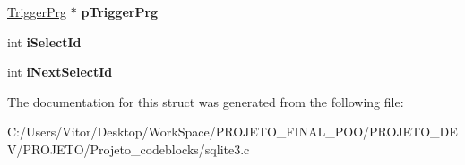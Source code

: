 \begin{DoxyCompactItemize}
\item 
\hypertarget{struct_parse_a0891dbd3b583594c5d07d7b061026ea4}{\hyperlink{struct_trigger_prg}{Trigger\-Prg} $\ast$ {\bfseries p\-Trigger\-Prg}}\label{struct_parse_a0891dbd3b583594c5d07d7b061026ea4}

\item 
\hypertarget{struct_parse_a7474fa0bf9ad160cbdf723406c306d9d}{int {\bfseries i\-Select\-Id}}\label{struct_parse_a7474fa0bf9ad160cbdf723406c306d9d}

\item 
\hypertarget{struct_parse_aab76240bd43c005941431179d4f9bf49}{int {\bfseries i\-Next\-Select\-Id}}\label{struct_parse_aab76240bd43c005941431179d4f9bf49}

\end{DoxyCompactItemize}


The documentation for this struct was generated from the following file\-:\begin{DoxyCompactItemize}
\item 
C\-:/\-Users/\-Vitor/\-Desktop/\-Work\-Space/\-P\-R\-O\-J\-E\-T\-O\-\_\-\-F\-I\-N\-A\-L\-\_\-\-P\-O\-O/\-P\-R\-O\-J\-E\-T\-O\-\_\-\-D\-E\-V/\-P\-R\-O\-J\-E\-T\-O/\-Projeto\-\_\-codeblocks/sqlite3.\-c\end{DoxyCompactItemize}
